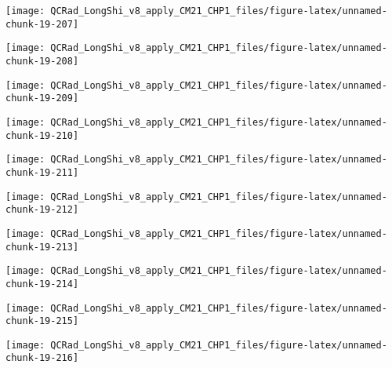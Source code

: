 \documentclass[
  10pt,
  a4paper,oneside]{article}
\begin{document}
\begin{center}\texttt{[image: QCRad\_LongShi\_v8\_apply\_CM21\_CHP1\_files/figure-latex/unnamed-chunk-19-207]} \end{center}

\begin{center}\texttt{[image: QCRad\_LongShi\_v8\_apply\_CM21\_CHP1\_files/figure-latex/unnamed-chunk-19-208]} \end{center}

\begin{center}\texttt{[image: QCRad\_LongShi\_v8\_apply\_CM21\_CHP1\_files/figure-latex/unnamed-chunk-19-209]} \end{center}

\begin{center}\texttt{[image: QCRad\_LongShi\_v8\_apply\_CM21\_CHP1\_files/figure-latex/unnamed-chunk-19-210]} \end{center}

\begin{center}\texttt{[image: QCRad\_LongShi\_v8\_apply\_CM21\_CHP1\_files/figure-latex/unnamed-chunk-19-211]} \end{center}

\begin{center}\texttt{[image: QCRad\_LongShi\_v8\_apply\_CM21\_CHP1\_files/figure-latex/unnamed-chunk-19-212]} \end{center}

\begin{center}\texttt{[image: QCRad\_LongShi\_v8\_apply\_CM21\_CHP1\_files/figure-latex/unnamed-chunk-19-213]} \end{center}

\begin{center}\texttt{[image: QCRad\_LongShi\_v8\_apply\_CM21\_CHP1\_files/figure-latex/unnamed-chunk-19-214]} \end{center}

\begin{center}\texttt{[image: QCRad\_LongShi\_v8\_apply\_CM21\_CHP1\_files/figure-latex/unnamed-chunk-19-215]} \end{center}

\begin{center}\texttt{[image: QCRad\_LongShi\_v8\_apply\_CM21\_CHP1\_files/figure-latex/unnamed-chunk-19-216]} \end{center}
\end{document}
